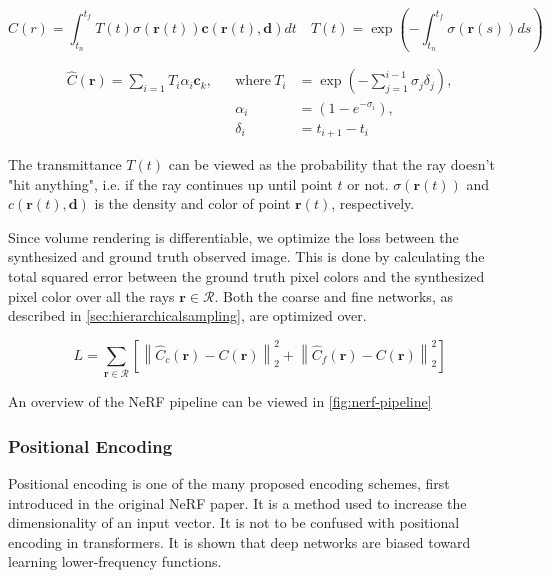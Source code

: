 
\begin{equation}
    C(r) = \int_{t_n}^{t_f}T(t)\sigma(\pmb{r}(t))\pmb{c}(\pmb{r}(t), \pmb{d})dt \quad T(t) = \exp{(-\int_{t_n}^{t_f}\sigma(\pmb{r}(s))ds)}
    \label{eq:volumerendering}
\end{equation}


\begin{align} \label{eq:numericalquadratureloss}
    \hat{C}(\pmb{r}) = \sum_{i=1}T_i \alpha_i \pmb{c}_k, && \text{where}~T_i &= \exp{(-\sum_{j=1}^{i-1} \sigma_j \delta_j)},  \\ 
    && \alpha_i &= (1-e^{-\sigma_i}), \\ 
    && \delta_i &= t_{i+1} - t_i
\end{align}


The transmittance $T(t)$ can be viewed as the probability that the ray doesn't "hit anything", i.e. if the ray continues up until point $t$ or not. $\sigma(\pmb{r}(t))$ and $c(\pmb{r}(t), \pmb{d})$ is the density and color of point $\pmb{r}(t)$, respectively.

Since volume rendering is differentiable, we optimize the loss between the synthesized and ground truth observed image. This is done by calculating the total squared error between the ground truth pixel colors and the synthesized pixel color over all the rays $\pmb{r} \in \mathcal{R}$. Both the coarse and fine networks, as described in \autoref{sec:hierarchicalsampling}, are optimized over.

\begin{equation}
    L = \sum_{\pmb{r} \in \mathcal{R}} \left[\left\| \hat{C}_c(\pmb{r}) - C(\pmb{r}) \right\|^2_2 + \left\| \hat{C}_f(\pmb{r}) - C(\pmb{r}) \right\|^2_2\right]
    \label{eq:nerfloss}
\end{equation}

An overview of the NeRF pipeline can be viewed in \autoref{fig:nerf-pipeline}

\subsubsection{Positional Encoding} \label{sec:positionalencoding}
Positional encoding is one of the many proposed encoding schemes, first introduced in the original NeRF paper. It is a method used to increase the dimensionality of an input vector. It is not to be confused with positional encoding in transformers. It is shown that deep networks are biased toward learning lower-frequency functions. 


